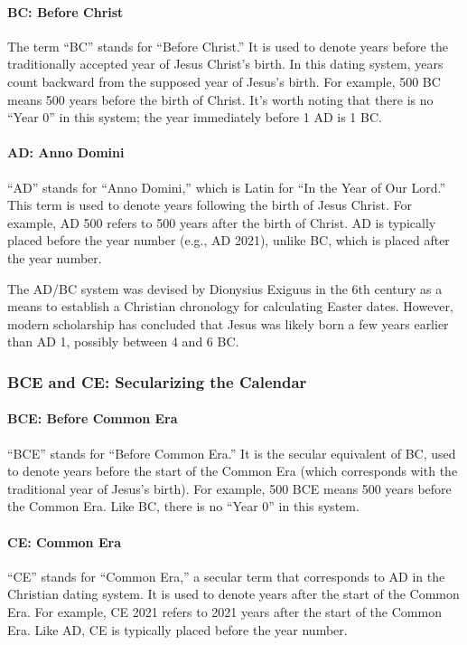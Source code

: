 \documentclass[a4paper,12pt]{book}
\begin{document}
\paragraph{BC: Before Christ}
The term ``BC'' stands for ``Before Christ.'' It is used to denote years before the traditionally accepted year of Jesus Christ’s birth. In this dating system, years count backward from the supposed year of Jesus’s birth. For example, 500 BC means 500 years before the birth of Christ. It’s worth noting that there is no ``Year 0'' in this system; the year immediately before 1 AD is 1 BC.

\paragraph{AD: Anno Domini}
``AD'' stands for ``Anno Domini,'' which is Latin for ``In the Year of Our Lord.'' This term is used to denote years following the birth of Jesus Christ. For example, AD 500 refers to 500 years after the birth of Christ. AD is typically placed before the year number (e.g., AD 2021), unlike BC, which is placed after the year number.

The AD/BC system was devised by Dionysius Exiguus in the 6th century as a means to establish a Christian chronology for calculating Easter dates. However, modern scholarship has concluded that Jesus was likely born a few years earlier than AD 1, possibly between 4 and 6 BC.

\subsubsection*{BCE and CE: Secularizing the Calendar}
\paragraph{BCE: Before Common Era}
``BCE'' stands for ``Before Common Era.'' It is the secular equivalent of BC, used to denote years before the start of the Common Era (which corresponds with the traditional year of Jesus’s birth). For example, 500 BCE means 500 years before the Common Era. Like BC, there is no ``Year 0'' in this system.

\paragraph{CE: Common Era}
``CE'' stands for ``Common Era,'' a secular term that corresponds to AD in the Christian dating system. It is used to denote years after the start of the Common Era. For example, CE 2021 refers to 2021 years after the start of the Common Era. Like AD, CE is typically placed before the year number.
\end{document}
